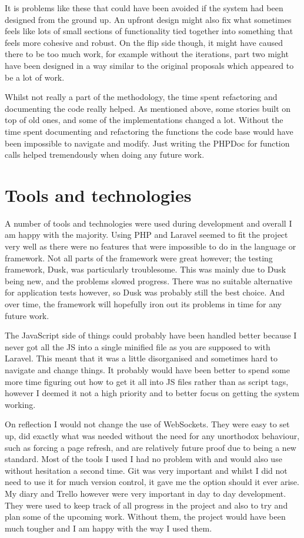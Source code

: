 It is problems like these that could have been avoided if the system had been designed from the ground up. An upfront design might also fix what sometimes feels like lots of small sections of functionality tied together into something that feels more cohesive and robust. On the flip side though, it might have caused there to be too much work, for example without the iterations, part two might have been designed in a way similar to the original proposals which appeared to be a lot of work.

Whilst not really a part of the methodology, the time spent refactoring and documenting the code really helped. As mentioned above, some stories built on top of old ones, and some of the implementations changed a lot. Without the time spent documenting and refactoring the functions the code base would have been impossible to navigate and modify. Just writing the PHPDoc for function calls helped tremendously when doing any future work.

\section{Tools and technologies}
A number of tools and technologies were used during development and overall I am happy with the majority. Using PHP and Laravel seemed to fit the project very well as there were no features that were impossible to do in the language or framework. Not all parts of the framework were great however; the testing framework, Dusk, was particularly troublesome. This was mainly due to Dusk being new, and the problems slowed progress. There was no suitable alternative for application tests however, so Dusk was probably still the best choice. And over time, the framework will hopefully iron out its problems in time for any future work. 

The JavaScript side of things could probably have been handled better because I never got all the JS into a single minified file as you are supposed to with Laravel. This meant that it was a little disorganised and sometimes hard to navigate and change things. It probably would have been better to spend some more time figuring out how to get it all into JS files rather than as script tags, however I deemed it not a high priority and to better focus on getting the system working.

On reflection I would not change the use of WebSockets. They were easy to set up, did exactly what was needed without the need for any unorthodox behaviour, such as forcing a page refresh, and are relatively future proof due to being a new standard. Most of the tools I used I had no problem with and would also use without hesitation a second time. Git was very important and whilst I did not need to use it for much version control, it gave me the option should it ever arise. My diary and Trello however were very important in day to day development. They were used to keep track of all progress in the project and also to try and plan some of the upcoming work. Without them, the project would have been much tougher and I am happy with the way I used them.

